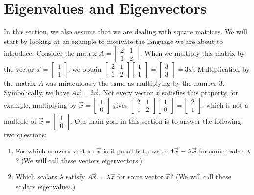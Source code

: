 {\section{Eigenvalues and Eigenvectors}
In this section, we also assume that we are dealing with square matrices.  We will start by looking at an example to motivate the language we are about to introduce.  Consider the matrix
$A=\begin{bmatrix} 2&1\\1&2\end{bmatrix} $.  When we multiply this matrix by the vector 
$\vec x = \begin{bmatrix} 1\\1\end{bmatrix} $, 
we obtain 
$\begin{bmatrix} 2&1\\1&2\end{bmatrix} \begin{bmatrix} 1\\1\end{bmatrix} = \begin{bmatrix} 3\\3\end{bmatrix}=3\vec x$. Multiplication by the matrix $A$ was miraculously the same as multiplying by the number 3. Symbolically, we have $A\vec x = 3\vec x$. 
Not every vector $\vec x$ satisfies this property, for example, multiplying by 
$\vec x = \begin{bmatrix} 1\\0\end{bmatrix} $ 
gives  
$\begin{bmatrix} 2&1\\1&2\end{bmatrix} \begin{bmatrix} 1\\0\end{bmatrix} = \begin{bmatrix} 2\\1\end{bmatrix}$, which is not a multiple of $\vec x = \begin{bmatrix} 1\\0\end{bmatrix} $. Our main goal in this section is to answer the following two questions:
\begin{enumerate}
	\item For which nonzero vectors $\vec x$ is it possible to write $A\vec x = \lambda \vec x$ for some scalar $\lambda$? (We will call these vectors eigenvectors.)
	\item Which scalars $\lambda$ satisfy $A\vec x = \lambda \vec x$ for some vector $\vec x$? (We will call these scalars eigenvalues.)
\end{enumerate}

}

